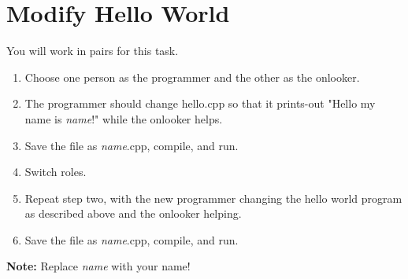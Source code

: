 \documentclass{article}
\begin{document}
\section*{Modify Hello World}
You will work in pairs for this task. 
\begin{enumerate}
\item Choose one person as the programmer and the other as the onlooker. 
\item The programmer should change hello.cpp so that it prints-out "Hello my name is \textit{name}!" while the onlooker helps. 
\item Save the file as \textit{name}.cpp, compile, and run. 
\item Switch roles. 
\item Repeat step two, with the new programmer changing the hello world program as described above and the onlooker helping. 
\item Save the file as \textit{name}.cpp, compile, and run.
\end{enumerate}
\textbf{Note:} Replace \textit{name} with your name! 
\end{document}
